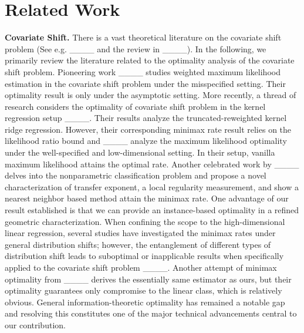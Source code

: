\section{Related Work}
\textbf{Covariate Shift.} 
There is a vast theoretical literature on the covariate shift problem (See e.g. ____ and the review in ____). 
In the following, we primarily review the literature related to the optimality analysis of the covariate shift problem.
Pioneering work ____ studies weighted maximum likelihood estimation in the covariate shift problem under the misspecified setting. Their optimality result is only under the asymptotic setting. 
More recently, a thread of research considers the optimality of covariate shift problem in the kernel regression setup ____. Their results analyze the truncated-reweighted kernel ridge regression. However, their corresponding minimax rate result relies on the likelihood ratio bound and ____ analyze the maximum likelihood optimality under the well-specified and low-dimensional setting. In their setup, vanilla maximum likelihood attains the optimal rate.
Another celebrated work by ____ delves into the nonparametric classification problem and propose a novel characterization of transfer exponent, a local regularity measurement, and show a nearest neighbor based method attain the minimax rate. One advantage of our result established is that we can provide an instance-based optimality in a refined geometric characterization.
When confining the scope to the high-dimensional linear regression, several studies have investigated the minimax rates under general distribution shifts; however, the entanglement of different types of distribution shift leads to suboptimal or inapplicable results when specifically applied to the covariate shift problem ____. Another attempt of minimax optimality from ____ derives the essentially same estimator as ours, but their optimality guarantees only compromise to the linear class, which is relatively obvious. General information-theoretic optimality has remained a notable gap and resolving this constitutes one of the major technical advancements central to our contribution.











